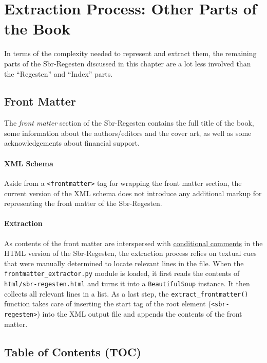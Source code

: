 \section{Extraction Process: Other Parts of the Book}
\label{sec:other}

In terms of the complexity needed to represent and extract them, the
remaining parts of the Sbr-Regesten discussed in this chapter are a
lot less involved than the ``Regesten'' and ``Index'' parts.

\subsection{Front Matter}
\label{sec:frontmatter}

The \emph{front matter} section of the Sbr-Regesten contains the full
title of the book, some information about the authors/editors and the
cover art, as well as some acknowledgements about financial support.

\paragraph{XML Schema}

Aside from a \texttt{<frontmatter>} tag for wrapping the front matter
section, the current version of the XML schema does not introduce any
additional markup for representing the front matter of the
Sbr-Regesten.

\paragraph{Extraction}

As contents of the front matter are interspersed with
\href{https://en.wikipedia.org/wiki/Conditional_comment}{conditional
  comments} in the HTML version of the Sbr-Regesten, the extraction
process relies on textual cues that were manually determined to locate
relevant lines in the file. When the
\texttt{frontmatter\_extractor.py} module is loaded, it first reads
the contents of \texttt{html/sbr-regesten.html} and turns it into a
\texttt{BeautifulSoup} instance. It then collects all relevant lines
in a list. As a last step, the \texttt{extract\_frontmatter()}
function takes care of inserting the start tag of the root element
(\texttt{<sbr-regesten>}) into the XML output file and appends the
contents of the front matter.

\subsection{Table of Contents (TOC)}
\label{sec:toc}

